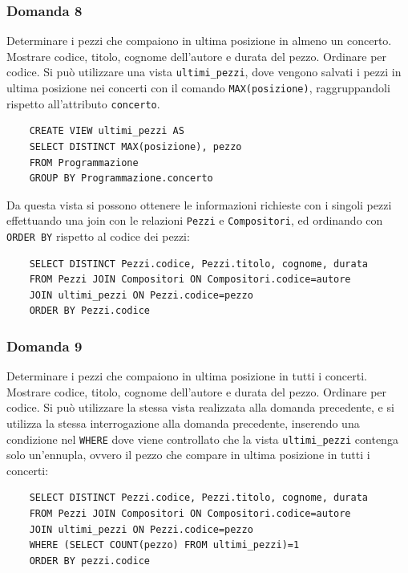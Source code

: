 \documentclass{article}
\begin{document}
\subsubsection*{Domanda 8}
Determinare i pezzi che compaiono in ultima posizione in almeno un concerto. Mostrare codice, titolo, cognome dell'autore e durata del pezzo. Ordinare per codice. Si può utilizzare una vista \verb|ultimi_pezzi|, 
dove vengono salvati i pezzi in ultima posizione nei concerti con il comando \verb|MAX(posizione)|, raggruppandoli rispetto all'attributo \verb|concerto|. 
\begin{verbatim}
    CREATE VIEW ultimi_pezzi AS
    SELECT DISTINCT MAX(posizione), pezzo
    FROM Programmazione 
    GROUP BY Programmazione.concerto
\end{verbatim}
Da questa vista si possono ottenere le informazioni richieste con i singoli pezzi effettuando una join con le relazioni \verb|Pezzi| e \verb|Compositori|, ed ordinando con \verb|ORDER BY| rispetto al codice dei 
pezzi:
\begin{verbatim}
    SELECT DISTINCT Pezzi.codice, Pezzi.titolo, cognome, durata
    FROM Pezzi JOIN Compositori ON Compositori.codice=autore
    JOIN ultimi_pezzi ON Pezzi.codice=pezzo
    ORDER BY Pezzi.codice
\end{verbatim}

\subsubsection*{Domanda 9}
Determinare i pezzi che compaiono in ultima posizione in tutti i concerti. Mostrare codice, titolo, cognome dell'autore e durata del pezzo. Ordinare per codice. Si può utilizzare la stessa vista realizzata 
alla domanda precedente, e si utilizza la stessa interrogazione alla domanda precedente, inserendo una condizione nel \verb|WHERE| dove viene controllato che la vista \verb|ultimi_pezzi| contenga solo un'ennupla, 
ovvero il pezzo che compare in ultima posizione in tutti i concerti:
\begin{verbatim}
    SELECT DISTINCT Pezzi.codice, Pezzi.titolo, cognome, durata
    FROM Pezzi JOIN Compositori ON Compositori.codice=autore
    JOIN ultimi_pezzi ON Pezzi.codice=pezzo
    WHERE (SELECT COUNT(pezzo) FROM ultimi_pezzi)=1
    ORDER BY pezzi.codice
\end{verbatim}
\end{document}
